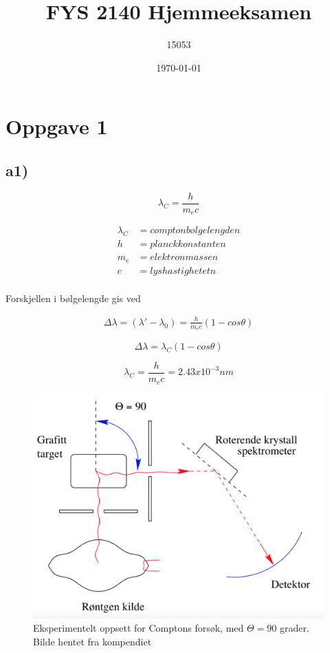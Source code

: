 \documentclass[norsk,a4paper,12pt]{article}
\title{FYS 2140 Hjemmeeksamen}
\author{15053}
\date{\today}
\begin{document}
\maketitle



\section*{Oppgave 1}

\subsection*{a1)}

\begin{equation}
\lambda_C = \frac{h}{m_ec}
\end{equation}


\begin{align*}
\lambda_C &= comptonbølgelengden \\
h &= planckkonstanten \\
m_e &= elektronmassen \\
c &= lyshastighetetn \\
\end{align*}

Forskjellen i bølgelengde gis ved 

\begin{align*}
\Delta \lambda = (\lambda' - \lambda_0) = \frac{h}{m_ec}(1-cos\theta)
\end{align*}

\begin{equation}
\Delta\lambda = \lambda_C(1-cos\theta)
\label{eq:comptonwavelength}
\end{equation}


\begin{equation}
\lambda_C = \frac{h}{m_ec}= 2.43 x 10^{-3} nm
\end{equation}





\begin{figure}[h]
\includegraphics[scale=0.4]{compton}
\caption{Eksperimentelt oppsett for Comptons forsøk, med $\Theta =90$ grader. Bilde hentet fra kompendiet}
\label{fig:compton}
\end{figure}
\end{document}
